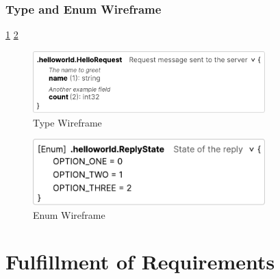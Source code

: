 \subsubsection{Type and Enum Wireframe}
\ref{fig:wireframe-type}
\ref{fig:wireframe-enum}

\begin{figure}[hbt!]
    \centering
    \captionsetup{justification=centering}
    \includegraphics[width=0.8\textwidth]{images/design/wireframes/type}
    \caption{Type Wireframe}
    \label{fig:wireframe-type}
\end{figure}

\begin{figure}[hbt!]
    \centering
    \captionsetup{justification=centering}
    \includegraphics[width=0.8\textwidth]{images/design/wireframes/enum}
    \caption{Enum Wireframe}
    \label{fig:wireframe-enum}
\end{figure}


\section{Fulfillment of Requirements}
%

